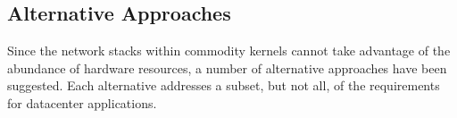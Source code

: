 



\subsection{Alternative Approaches}
\label{sec:motivation:current}


Since the network stacks within commodity kernels cannot take
advantage of the abundance of hardware resources, a number of
alternative approaches have been suggested. Each alternative addresses
a subset, but not all, of the requirements for datacenter applications.

